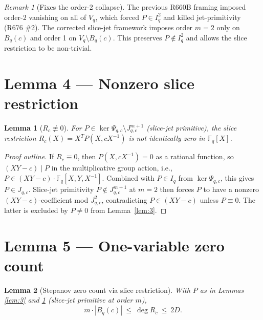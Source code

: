 \documentclass[12pt]{amsart}
\newtheorem{lemma}{Lemma}
\theoremstyle{definition}
\theoremstyle{remark}
\newtheorem{remark}{Remark}
\begin{document}
\begin{remark}[Fixes the order-2 collapse]
The previous R660B framing imposed order-2 vanishing on all of $V_q$, which forced
$P \in I_q^2$ and killed jet-primitivity (R676 \#2). The corrected slice-jet
framework imposes order $m=2$ only on $B_q(c)$ and order 1 on $V_q \setminus B_q(c)$.
This preserves $P \notin I_q^2$ and allows the slice restriction to be non-trivial.
\end{remark}

\section{Lemma 4 --- Nonzero slice restriction}

\begin{lemma}[$R_c \not\equiv 0$]\label{lem:4}
For $P \in \ker \Psi_{q, c} \setminus J_{q, c}^{m+1}$ (slice-jet primitive),
the slice restriction $R_c(X) = X^T P(X, c X^{-1})$ is not identically zero in $\mathbb{F}_q[X]$.
\end{lemma}

\begin{proof}[Proof outline]
If $R_c \equiv 0$, then $P(X, c X^{-1}) = 0$ as a rational function, so
$(XY - c) \mid P$ in the multiplicative group action, i.e., $P \in (X Y - c) \cdot \mathbb{F}_q[X, Y, X^{-1}]$.
Combined with $P \in I_q$ from $\ker \Psi_{q, c}$, this gives $P \in J_{q, c}$.
Slice-jet primitivity $P \notin J_{q, c}^{m+1}$ at $m = 2$ then forces $P$ to have a
nonzero $(XY - c)$-coefficient mod $J_{q, c}^2$, contradicting $P \in (XY - c)$
unless $P \equiv 0$. The latter is excluded by $P \ne 0$ from Lemma~\ref{lem:3}.
\end{proof}

\section{Lemma 5 --- One-variable zero count}

\begin{lemma}[Stepanov zero count via slice restriction]\label{lem:5}
With $P$ as in Lemmas \ref{lem:3} and \ref{lem:4} (slice-jet primitive at order $m$),
$$
m \cdot |B_q(c)|\ \le\ \deg R_c\ \le\ 2 D.
$$
\end{lemma}
\end{document}
